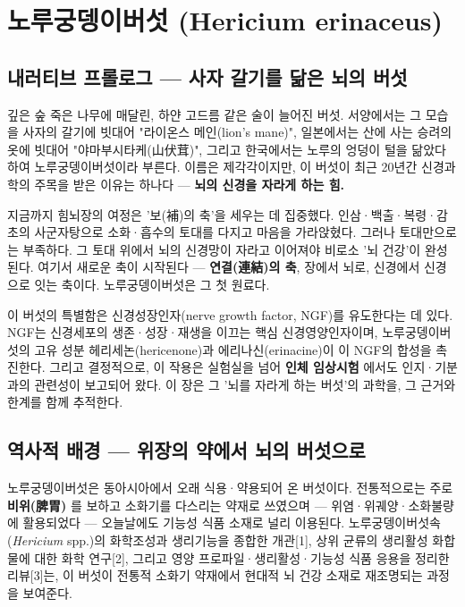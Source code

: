 \documentclass[11pt,oneside]{book}
\begin{document}

\chapter{노루궁뎅이버섯 (Hericium erinaceus)}

\section{내러티브 프롤로그 — 사자 갈기를 닮은 뇌의 버섯}
깊은 숲 죽은 나무에 매달린, 하얀 고드름 같은 술이 늘어진 버섯. 서양에서는 그 모습을 사자의 갈기에 빗대어 "라이온스 메인(lion's mane)", 일본에서는 산에 사는 승려의 옷에 빗대어 "야마부시타케(山伏茸)", 그리고 한국에서는 노루의 엉덩이 털을 닮았다 하여 노루궁뎅이버섯이라 부른다. 이름은 제각각이지만, 이 버섯이 최근 20년간 신경과학의 주목을 받은 이유는 하나다 — \textbf{뇌의 신경을 자라게 하는 힘.}

지금까지 힘뇌장의 여정은 '보(補)의 축'을 세우는 데 집중했다. 인삼·백출·복령·감초의 사군자탕으로 소화·흡수의 토대를 다지고 마음을 가라앉혔다. 그러나 토대만으로는 부족하다. 그 토대 위에서 뇌의 신경망이 자라고 이어져야 비로소 '뇌 건강'이 완성된다. 여기서 새로운 축이 시작된다 — \textbf{연결(連結)의 축}, 장에서 뇌로, 신경에서 신경으로 잇는 축이다. 노루궁뎅이버섯은 그 첫 원료다.

이 버섯의 특별함은 신경성장인자(nerve growth factor, NGF)를 유도한다는 데 있다. NGF는 신경세포의 생존·성장·재생을 이끄는 핵심 신경영양인자이며, 노루궁뎅이버섯의 고유 성분 헤리세논(hericenone)과 에리나신(erinacine)이 이 NGF의 합성을 촉진한다. 그리고 결정적으로, 이 작용은 실험실을 넘어 \textbf{인체 임상시험} 에서도 인지·기분과의 관련성이 보고되어 왔다. 이 장은 그 '뇌를 자라게 하는 버섯'의 과학을, 그 근거와 한계를 함께 추적한다.

\section{역사적 배경 — 위장의 약에서 뇌의 버섯으로}
노루궁뎅이버섯은 동아시아에서 오래 식용·약용되어 온 버섯이다. 전통적으로는 주로 \textbf{비위(脾胃)} 를 보하고 소화기를 다스리는 약재로 쓰였으며 — 위염·위궤양·소화불량에 활용되었다 — 오늘날에도 기능성 식품 소재로 널리 이용된다. 노루궁뎅이버섯속(\textit{Hericium} spp.)의 화학조성과 생리기능을 종합한 개관[1], 상위 균류의 생리활성 화합물에 대한 화학 연구[2], 그리고 영양 프로파일·생리활성·기능성 식품 응용을 정리한 리뷰[3]는, 이 버섯이 전통적 소화기 약재에서 현대적 뇌 건강 소재로 재조명되는 과정을 보여준다.
\end{document}
